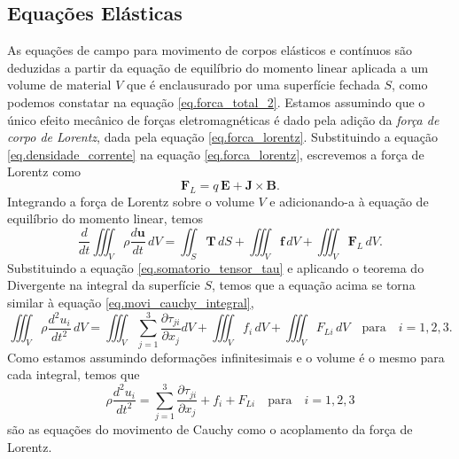 \subsection{Equa\c{c}\~oes El\'asticas}

As equa\c{c}\~oes de campo para movimento de corpos el\' asticos e cont\'inuos s\~ao deduzidas a partir da equa\c{c}\~ao de equil\'ibrio do momento linear aplicada a um volume de material $V$ que \'e enclausurado por uma superf\'icie fechada $S$, como podemos constatar na equa\c{c}\~ao \ref{eq.forca_total_2}. Estamos assumindo que o \'unico efeito mec\^anico de for\c{c}as eletromagn\'eticas \'e dado pela adi\c{c}\~ao da \textit{for\c{c}a de corpo de Lorentz}, dada pela equa\c{c}\~ao \ref{eq.forca_lorentz}. Substituindo a equa\c{c}\~ao \ref{eq.densidade_corrente} na equa\c{c}\~ao \ref{eq.forca_lorentz}, escrevemos a for\c{c}a de Lorentz como
\begin{equation}
\textbf{F}_L=q\,\mathbf{E}+\textbf{J}\times\textbf{B}.
\end{equation}
Integrando a for\c{c}a de Lorentz sobre o volume $V$ e adicionando-a \`a equa\c{c}\~ao de equil\'ibrio do momento linear, temos
\begin{equation}
\frac{d}{dt}\iiint_V\rho\frac{d\mathbf{u}}{dt}\,dV=\iint_S\mathbf{T}\,dS+\iiint_V\mathbf{f}\,dV+\iiint_V\textbf{F}_L\,dV.
\end{equation}
Substituindo a equa\c{c}\~ao \ref{eq.somatorio_tensor_tau} e aplicando o teorema do Divergente na integral da superf\'icie $S$, temos que a equa\c{c}\~ao acima se torna similar \`a equa\c{c}\~ao \ref{eq.movi_cauchy_integral},
\begin{equation*}
\iiint_V\rho\frac{d^2u_i}{dt^2}\,dV=\iiint_V\sum_{j=1}^3\frac{\partial\tau_{ji}}{\partial x_j}dV+\iiint_Vf_i\,dV+\iiint_V F_{Li}\,dV\quad \text{para}\quad i=1,2,3.
\end{equation*}
Como estamos assumindo deforma\c{c}\~oes infinitesimais e o volume \'e o mesmo para cada integral, temos que
\begin{equation*}
\rho\frac{d^2u_i}{dt^2}=\sum_{j=1}^3\frac{\partial\tau_{ji}}{\partial x_j}+f_i+F_{Li}\quad \text{para}\quad i=1,2,3
\end{equation*}
s\~ao as equa\c{c}\~oes do movimento de Cauchy como o acoplamento da for\c{c}a de Lorentz.


